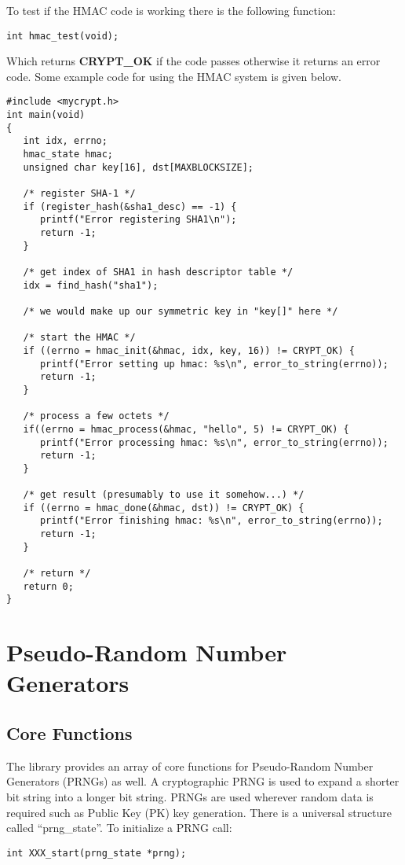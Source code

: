 \documentclass{book}
\begin{document}
To test if the HMAC code is working there is the following function:
\begin{verbatim}
int hmac_test(void);
\end{verbatim}
Which returns {\bf CRYPT\_OK} if the code passes otherwise it returns an error code.  Some example code for using the 
HMAC system is given below.

\begin{small}
\begin{verbatim}
#include <mycrypt.h>
int main(void)
{
   int idx, errno;
   hmac_state hmac;
   unsigned char key[16], dst[MAXBLOCKSIZE];

   /* register SHA-1 */
   if (register_hash(&sha1_desc) == -1) {
      printf("Error registering SHA1\n");
      return -1;
   }

   /* get index of SHA1 in hash descriptor table */
   idx = find_hash("sha1");

   /* we would make up our symmetric key in "key[]" here */

   /* start the HMAC */
   if ((errno = hmac_init(&hmac, idx, key, 16)) != CRYPT_OK) {
      printf("Error setting up hmac: %s\n", error_to_string(errno));
      return -1;
   }

   /* process a few octets */
   if((errno = hmac_process(&hmac, "hello", 5) != CRYPT_OK) {
      printf("Error processing hmac: %s\n", error_to_string(errno));
      return -1;
   }

   /* get result (presumably to use it somehow...) */
   if ((errno = hmac_done(&hmac, dst)) != CRYPT_OK) {
      printf("Error finishing hmac: %s\n", error_to_string(errno));
      return -1;
   }
  
   /* return */
   return 0;
}
\end{verbatim}
\end{small}

\chapter{Pseudo-Random Number Generators}
\section{Core Functions}

The library provides an array of core functions for Pseudo-Random Number Generators (PRNGs) as well.  A cryptographic PRNG is
used to expand a shorter bit string into a longer bit string.  PRNGs are used wherever random data is required such as Public Key (PK)
key generation.  There is a universal structure called ``prng\_state''.  To initialize a PRNG call:
\begin{verbatim}
int XXX_start(prng_state *prng);
\end{verbatim}
\end{document}
